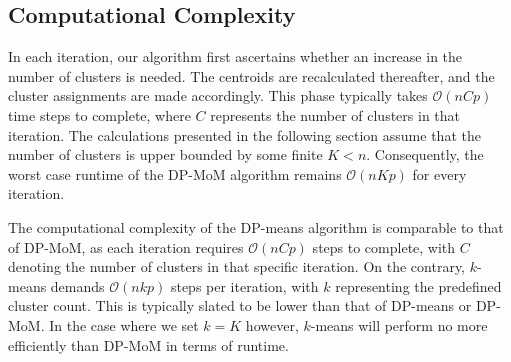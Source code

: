 \documentclass{article}
\begin{document}

\subsection{Computational Complexity}
In each iteration, our algorithm first ascertains whether an increase in the number of clusters is needed. The centroids are recalculated thereafter, and the cluster assignments are made accordingly. This phase typically takes $\mathcal{O}(nCp)$ time steps to complete, where $C$ represents the number of clusters in that iteration. The calculations presented in the following section assume that the number of clusters is upper bounded by some finite $K<n$. Consequently, the worst case runtime of the DP-MoM algorithm remains $\mathcal{O}(nKp)$ for every iteration.

The computational complexity of the DP-means algorithm is comparable to that of DP-MoM, as each iteration requires $\mathcal{O}(nCp)$ steps to complete, with $C$ denoting the number of clusters in that specific iteration. On the contrary, $k$-means demands $\mathcal{O}(nkp)$ steps per iteration, with $k$ representing the predefined cluster count. This is typically slated to be lower than that of DP-means or DP-MoM. In the case where we set $k=K$ however, $k$-means will perform no more efficiently than DP-MoM in terms of runtime.
\end{document}
